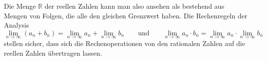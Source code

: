 Die Menge $\mathbb{R}$ der reellen Zahlen kann man also ansehen
als bestehend aus Mengen von Folgen, die alle den gleichen Grenzwert
haben.
Die Rechenregeln der Analysis 
\[
\lim_{n\to\infty} (a_n + b_n)
=
\lim_{n\to\infty} a_n +
\lim_{n\to\infty} b_n
\qquad\text{und}\qquad
\lim_{n\to\infty} a_n \cdot b_n
=
\lim_{n\to\infty} a_n \cdot
\lim_{n\to\infty} b_n 
\]
stellen sicher, dass sich die Rechenoperationen von den rationalen
Zahlen auf die reellen Zahlen übertragen lassen.





